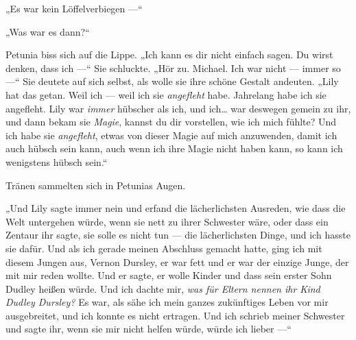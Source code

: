 „Es war kein Löffelverbiegen —“

„Was war es dann?“

Petunia biss sich auf die Lippe. „Ich kann es dir nicht einfach sagen. Du wirst denken, dass ich —“ Sie schluckte. „Hör zu. Michael. Ich war nicht — immer so —“ Sie deutete auf sich selbst, als wolle sie ihre schöne Gestalt andeuten. „Lily hat das getan. Weil ich — weil ich sie \emph{angefleht} habe. Jahrelang habe ich sie angefleht. Lily war \emph{immer} hübscher als ich, und ich… war deswegen gemein zu ihr, und dann bekam sie \emph{Magie}, kannst du dir vorstellen, wie ich mich fühlte? Und ich habe sie \emph{angefleht}, etwas von dieser Magie auf mich anzuwenden, damit ich auch hübsch sein kann, auch wenn ich ihre Magie nicht haben kann, so kann ich wenigstens hübsch sein.“

Tränen sammelten sich in Petunias Augen.

„Und Lily sagte immer nein und erfand die lächerlichsten Ausreden, wie dass die Welt untergehen würde, wenn sie nett zu ihrer Schwester wäre, oder dass ein Zentaur ihr sagte, sie solle es nicht tun — die lächerlichsten Dinge, und ich hasste sie dafür. Und als ich gerade meinen Abschluss gemacht hatte, ging ich mit diesem Jungen aus, Vernon Dursley, er war fett und er war der einzige Junge, der mit mir reden wollte. Und er sagte, er wolle Kinder und dass sein erster Sohn Dudley heißen würde. Und ich dachte mir, \emph{was für Eltern nennen ihr Kind Dudley Dursley?} Es war, als sähe ich mein ganzes zukünftiges Leben vor mir ausgebreitet, und ich konnte es nicht ertragen. Und ich schrieb meiner Schwester und sagte ihr, wenn sie mir nicht helfen würde, würde ich lieber —“

